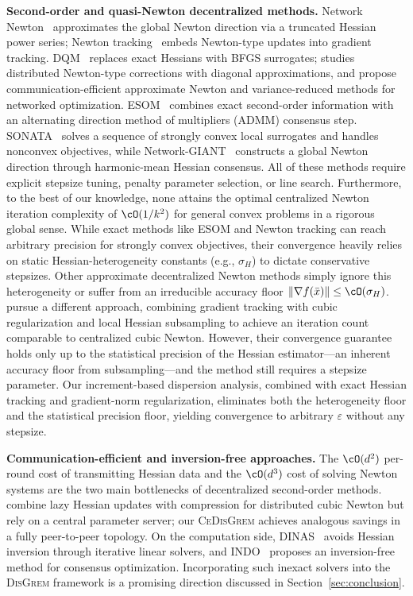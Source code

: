 \documentclass[review,onefignum,onetabnum]{siamart171218}
\begin{document}
	\noindent\textbf{Second-order and quasi-Newton decentralized methods.}
	Network Newton~\citep{mokhtari2017networknewton} approximates
	the global Newton direction via a truncated Hessian power series;
	Newton tracking~\citep{zhang2021newtontracking} embeds Newton-type
	updates into gradient tracking.
	DQM~\citep{eisen2017dqn} replaces exact Hessians with BFGS
	surrogates; \citet{bajovic2017newton} studies distributed
	Newton-type corrections with diagonal approximations, and
	\citet{li2020communication} propose communication-efficient
	approximate Newton and variance-reduced methods for networked optimization.
	ESOM~\citep{mokhtari2016esom} combines exact second-order information
	with an alternating direction method of multipliers (ADMM) consensus step.
	SONATA~\citep{sun2022sonata} solves a sequence of strongly convex
	local surrogates and handles nonconvex objectives, while
	Network-GIANT~\citep{maritan2023networkgiant} constructs a global Newton
	direction through harmonic-mean Hessian consensus.
	All of these methods require explicit stepsize tuning, penalty
	parameter selection, or line search.
	Furthermore, to the best of our knowledge, none attains the optimal
	centralized Newton iteration complexity of $\cO(1/k^2)$ for general
	convex problems in a rigorous global sense.
	While exact methods like ESOM and Newton tracking can reach
	arbitrary precision for strongly convex objectives, their
	convergence heavily relies on static Hessian-heterogeneity
	constants (e.g., $\sigma_H$) to dictate conservative stepsizes.
	Other approximate decentralized Newton methods simply ignore this
	heterogeneity or suffer from an irreducible accuracy floor
	$\|\nabla f(\bar x)\|\le\cO(\sigma_H)$.
	\citet{daneshmand2021newton} pursue a different approach, combining
	gradient tracking with cubic regularization and local Hessian
	subsampling to achieve an iteration count comparable to centralized
	cubic Newton.
	However, their convergence guarantee holds only up to the statistical
	precision of the Hessian estimator---an inherent accuracy floor from
	subsampling---and the method still requires a stepsize parameter.
	Our increment-based dispersion analysis, combined with
	exact Hessian tracking and gradient-norm regularization, eliminates
	both the heterogeneity floor and the statistical precision floor,
	yielding convergence to arbitrary $\varepsilon$ without any stepsize.
	
	\noindent\textbf{Communication-efficient and inversion-free approaches.}
	The $\cO(d^2)$ per-round cost of transmitting Hessian data and
	the $\cO(d^3)$ cost of solving Newton systems are the two main
	bottlenecks of decentralized second-order methods.
	\citet{zhang2024cubic} combine lazy Hessian updates with
	compression for distributed cubic Newton but rely on a central
	parameter server; our \textsc{CeDisGrem} achieves analogous
	savings in a fully peer-to-peer topology.
	On the computation side, DINAS~\citep{jakovetic2025dinas} avoids
	Hessian inversion through iterative linear solvers, and
	INDO~\citep{yuan2023indo} proposes an inversion-free method for
	consensus optimization.
	Incorporating such inexact solvers into the \textsc{DisGrem}
	framework is a promising direction discussed in
	Section~\ref{sec:conclusion}.
	
\end{document}
